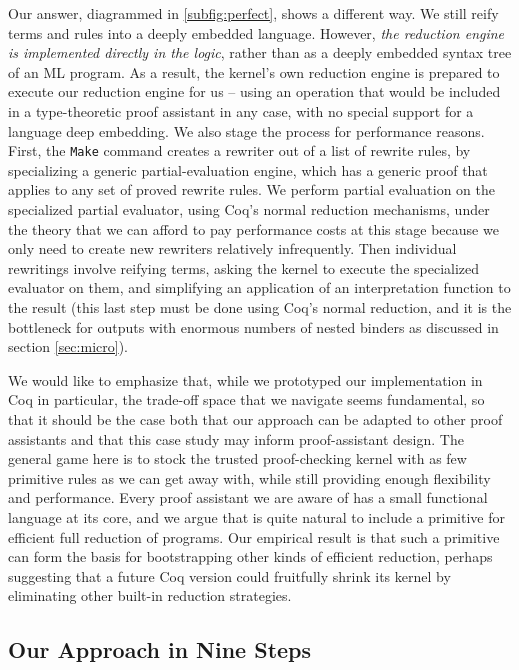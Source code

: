 Our answer, diagrammed in \autoref{subfig:perfect}, shows a different way.
We still reify terms and rules into a deeply embedded language.
However, \emph{the reduction engine is implemented directly in the logic}, rather than as a deeply embedded syntax tree of an ML program.
As a result, the kernel's own reduction engine is prepared to execute our reduction engine for us -- using an operation that would be included in a type-theoretic proof assistant in any case, with no special support for a language deep embedding.
We also stage the process for performance reasons.
First, the \texttt{Make} command creates a rewriter out of a list of rewrite rules, by specializing a generic partial-evaluation engine, which has a generic proof that applies to any set of proved rewrite rules.
We perform partial evaluation on the specialized partial evaluator, using Coq's normal reduction mechanisms, under the theory that we can afford to pay performance costs at this stage because we only need to create new rewriters relatively infrequently.
Then individual rewritings involve reifying terms, asking the kernel to execute the specialized evaluator on them, and simplifying an application of an interpretation function to the result (this last step must be done using Coq's normal reduction, and it is the bottleneck for outputs with enormous numbers of nested binders as discussed in section \ref{sec:micro}).

We would like to emphasize that, while we prototyped our implementation in Coq in particular, the trade-off space that we navigate seems fundamental, so that it should be the case both that our approach can be adapted to other proof assistants and that this case study may inform proof-assistant design.
The general game here is to stock the trusted proof-checking kernel with as few primitive rules as we can get away with, while still providing enough flexibility and performance.
Every proof assistant we are aware of has a small functional language at its core, and we argue that is quite natural to include a primitive for efficient full reduction of programs.
Our empirical result is that such a primitive can form the basis for bootstrapping other kinds of efficient reduction, perhaps suggesting that a future Coq version could fruitfully shrink its kernel by eliminating other built-in reduction strategies.

\subsection{Our Approach in Nine Steps}\label{sec:nine-steps}

